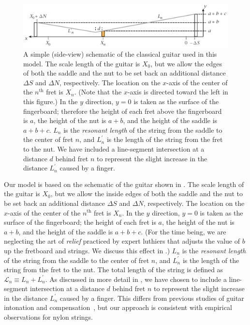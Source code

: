  \begin{figure}
  \centering
  \includegraphics[width=7.0in]{figures/fretting_schematic}
  \caption{\label{fig:guitar_schematic} A simple (side-view) schematic of the classical guitar used in this model. The scale length of the guitar is $X_0$, but we allow the edges of both the saddle and the nut to be set back an additional distance $\Delta S$ and $\Delta N$, respectively. The location on the $x$-axis of the center of the $n^\textrm{th}$ fret is $X_n$. (Note that the $x$-axis is directed toward the left in this figure.) In the $y$ direction, $y = 0$ is taken as the surface of the fingerboard; therefore the height of each fret above the fingerboard is $a$, the height of the nut is $a + b$, and the height of the saddle is $a + b + c$. $L_n$ is the \emph{resonant length} of the string from the saddle to the center of fret $n$, and $L^\prime_n$ is the length of the string from the fret to the nut. We have included a line-segment intersection at a distance $d$ behind fret $n$ to represent the slight increase in the distance $L_n^\prime$ caused by a finger.}
 \end{figure}

Our model is based on the schematic of the guitar shown in . The scale length of the guitar is $X_0$, but we allow the inside edges of both the saddle and the nut to be set back an additional distance $\Delta S$ and $\Delta N$, respectively. The location on the $x$-axis of the center of the $n^\textrm{th}$ fret is $X_n$. In the $y$ direction, $y = 0$ is taken as the surface of the fingerboard; the height of each fret is $a$, the height of the nut is $a + b$, and the height of the saddle is $a + b + c$. (For the time being, we are neglecting the art of \emph{relief} practiced by expert luthiers that adjusts the value of $b$ up the fretboard and strings. We discuss this effect in .) $L_n$ is the \emph{resonant length} of the string from the saddle to the center of fret $n$, and $L^\prime_n$ is the length of the string from the fret to the nut. The total length of the string is defined as $\mathcal{L}_n \equiv L_n + L^\prime_n$. As discussed in more detail in , we have chosen to include a line-segment intersection at a distance $d$ behind fret $n$ to represent the slight increase in the distance $L_n^\prime$ caused by a finger. This differs from previous studies of guitar intonation and compensation~\cite{ref:byers1996cgi,ref:varieschi2010icf}, but our approach is consistent with empirical observations for nylon strings.

